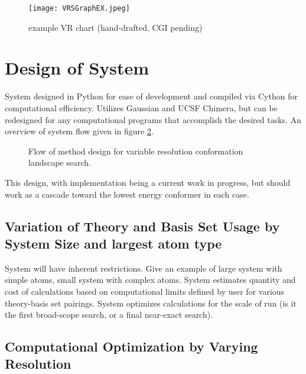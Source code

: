 \begin{figure}
	
	\centering
	
	\texttt{[image: VRSGraphEX.jpeg]}
	
	\caption{example VR chart (hand-drafted, CGI pending)}
	
	\label{fig:variableResolutionSample}
		
\end{figure}

\section{Design of System}

System designed in Python for ease of development and compiled via Cython for computational efficiency. 
Utilizes Gaussian and UCSF Chimera, but can be redesigned for any computational programs that accomplish the desired tasks.
An overview of system flow given in figure \ref{fig:VRSDesign}.


\begin{figure}
	\centering 
		\caption{Flow of method design for variable resolution conformation landscape search.}
		\label{fig:VRSDesign}

\end{figure}


This design, with implementation being a current work in progress, but should{\texttrademark} work as a cascade toward the lowest energy conformer in each case.

\subsection{Variation of Theory and Basis Set Usage by System Size and largest atom type}

System will have inherent restrictions. Give an example of large system with simple atoms, small system with complex atoms.
System estimates quantity and cost of calculations based on computational limits defined by user for various theory-basis set pairings. 
System optimizes calculations for the scale of run (is it the first broad-scope search, or a final near-exact search).


\subsection{Computational Optimization by Varying Resolution}

